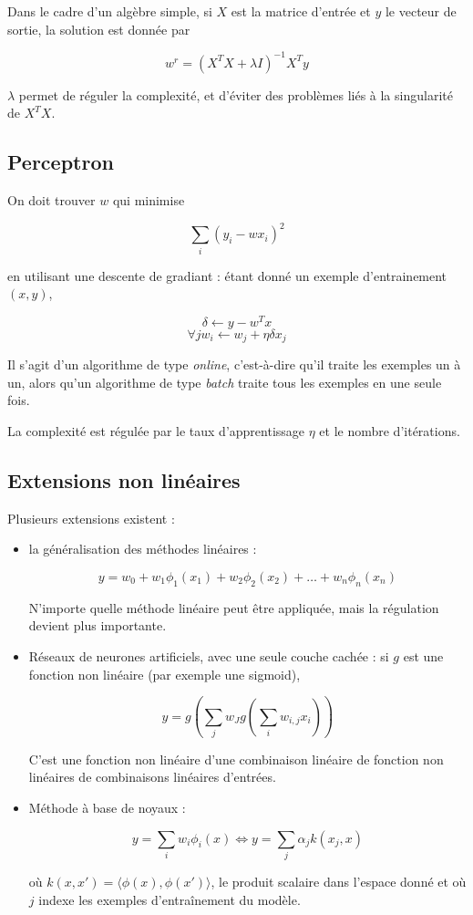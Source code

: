 		Dans le cadre d'un algèbre simple, si $X$ est la matrice d'entrée et $y$ le vecteur de sortie, la solution est donnée par
	
		$$w^r = (X^T X + \lambda I)^{-1}X^Ty$$
	
		$\lambda$ permet de réguler la complexité, et d'éviter des problèmes liés à la singularité de $X^TX$.
	
		\subsection{Perceptron}
	
		On doit trouver $w$ qui minimise
	
		$$\sum_i (y_i - wx_i)^2$$
	
		en utilisant une descente de gradiant : étant donné un exemple d'entrainement $(x, y)$,
	
		$$\delta \leftarrow y - w^Tx$$
		$$\forall jw_i \leftarrow w_j + \eta \delta x_j$$
	
		Il s'agit d'un algorithme de type \textit{online}, c'est-à-dire qu'il traite les exemples un à un, alors qu'un algorithme de type \textit{batch} traite tous les exemples en une seule fois.
	
		La complexité est régulée par le taux d'apprentissage $\eta$ et le nombre d'itérations.
	
		\subsection{Extensions non linéaires}
	
		Plusieurs extensions existent :
	
		\begin{itemize}
			\item la généralisation des méthodes linéaires :
		
			$$y = w_0 + w_1 \phi_1(x_1) + w_2 \phi_2(x_2) + \dots + w_n \phi_n(x_n)$$
		
			N'importe quelle méthode linéaire peut être appliquée, mais la régulation devient plus importante.
		
			\item Réseaux de neurones artificiels, avec une seule couche cachée : si $g$ est une fonction non linéaire (par exemple une sigmoid),
		
			$$y = g(\sum_j w_J g(\sum_i w_{i, j} x_i))$$
		
			C'est une fonction non linéaire d'une combinaison linéaire de fonction non linéaires de combinaisons linéaires d'entrées.
		
			\item Méthode à base de noyaux :
		
			$$y = \sum_i w_i \phi_i(x) \Leftrightarrow y = \sum_j \alpha_j k(x_j, x)$$
		
			où $k(x, x') = \langle \phi(x), \phi(x') \rangle$, le produit scalaire dans l'espace donné et où $j$ indexe les exemples d'entraînement du modèle.
		\end{itemize}


